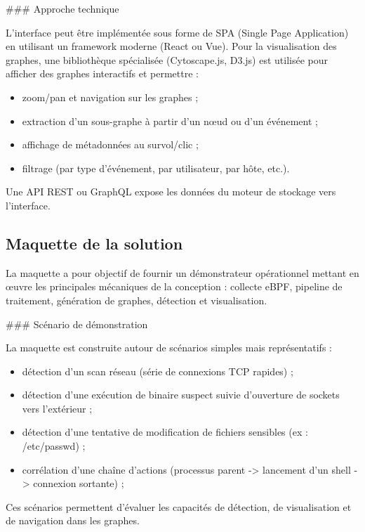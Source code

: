 \documentclass[a4paper,12pt]{article}
\begin{document}
### Approche technique

L'interface peut être implémentée sous forme de SPA (Single Page Application) en utilisant un framework moderne (React ou Vue). Pour la visualisation des graphes, une bibliothèque spécialisée (Cytoscape.js, D3.js) est utilisée pour afficher des graphes interactifs et permettre :

\begin{itemize}
  \item zoom/pan et navigation sur les graphes ;
  \item extraction d'un sous-graphe à partir d'un nœud ou d'un événement ;
  \item affichage de métadonnées au survol/clic ;
  \item filtrage (par type d'événement, par utilisateur, par hôte, etc.).
\end{itemize}

Une API REST ou GraphQL expose les données du moteur de stockage vers l'interface.

\subsection{Maquette de la solution}

La maquette a pour objectif de fournir un démonstrateur opérationnel mettant en œuvre les principales mécaniques de la conception : collecte eBPF, pipeline de traitement, génération de graphes, détection et visualisation.

### Scénario de démonstration

La maquette est construite autour de scénarios simples mais représentatifs :

\begin{itemize}
  \item détection d'un scan réseau (série de connexions TCP rapides) ;
  \item détection d'une exécution de binaire suspect suivie d'ouverture de sockets vers l'extérieur ;
  \item détection d'une tentative de modification de fichiers sensibles (ex : /etc/passwd) ;
  \item corrélation d'une chaîne d'actions (processus parent -> lancement d'un shell -> connexion sortante) ;
\end{itemize}

Ces scénarios permettent d'évaluer les capacités de détection, de visualisation et de navigation dans les graphes.
\end{document}
